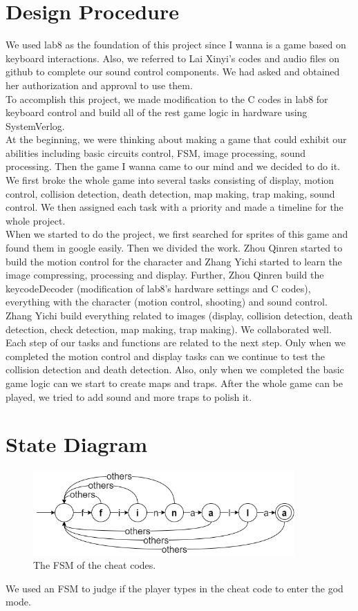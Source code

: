 \documentclass[12pt]{article}
\begin{document}
\section{Design Procedure}
We used lab8 as the foundation of this project since I wanna is a game based on keyboard interactions. Also, we referred to Lai Xinyi's codes and audio files on github to complete our sound control components. We had asked and obtained her authorization and approval to use them. \\

To accomplish this project, we made modification to the C codes in lab8 for keyboard control and build all of the rest game logic in hardware using SystemVerlog. \\

At the beginning, we were thinking about making a game that could exhibit our abilities including basic circuits control, FSM, image processing, sound processing. Then the game I wanna came to our mind and we decided to do it. We first broke the whole game into several tasks consisting of display, motion control, collision detection, death detection, map making, trap making, sound control. We then assigned each task with a priority and made a timeline for the whole project. \\

When we started to do the project, we first searched for sprites of this game and found them in google easily. Then we divided the work. Zhou Qinren started to build the motion control for the character and Zhang Yichi started to learn the image compressing, processing and display. Further, Zhou Qinren build the keycodeDecoder (modification of lab8's hardware settings and C codes), everything with the character (motion control, shooting) and sound control. Zhang Yichi build everything related to images (display, collision detection, death detection, check detection, map making, trap making). We collaborated well. Each step of our tasks and functions are related to the next step. Only when we completed the motion control and display tasks can we continue to test the collision detection and death detection. Also, only when we completed the basic game logic can we start to create maps and traps. After the whole game can be played, we tried to add sound and more traps to polish it. 

\section{State Diagram}
\begin{figure}[H]
    \centering
    \includegraphics[width=10cm]{CheatCode.png}
    \caption{The FSM of the cheat codes.}
\end{figure}
We used an FSM to judge if the player types in the cheat code to enter the god mode.
\end{document}
